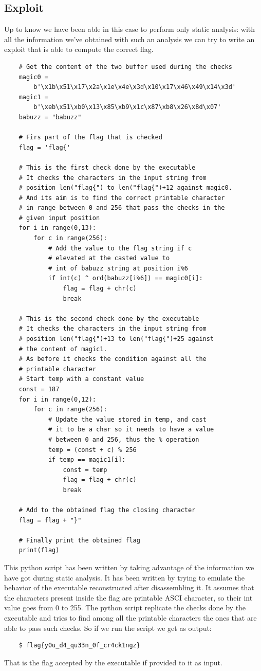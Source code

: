 \documentclass{article}
\begin{document}
\subsection{Exploit}
Up to know we have been able in this case to perform only static analysis: with all the information we've obtained with such an analysis we can try to write an exploit that is able to compute the correct flag.
\begin{verbatim}
    # Get the content of the two buffer used during the checks
    magic0 = 
        b'\x1b\x51\x17\x2a\x1e\x4e\x3d\x10\x17\x46\x49\x14\x3d'
    magic1 = 
        b'\xeb\x51\xb0\x13\x85\xb9\x1c\x87\xb8\x26\x8d\x07'
    babuzz = "babuzz"

    # Firs part of the flag that is checked
    flag = 'flag{'

    # This is the first check done by the executable
    # It checks the characters in the input string from
    # position len("flag{") to len("flag{")+12 against magic0.
    # And its aim is to find the correct printable character
    # in range between 0 and 256 that pass the checks in the 
    # given input position
    for i in range(0,13):
        for c in range(256):
            # Add the value to the flag string if c
            # elevated at the casted value to
            # int of babuzz string at position i%6
            if int(c) ^ ord(babuzz[i%6]) == magic0[i]:
                flag = flag + chr(c)
                break

    # This is the second check done by the executable
    # It checks the characters in the input string from
    # position len("flag{")+13 to len("flag{")+25 against
    # the content of magic1.
    # As before it checks the condition against all the
    # printable character
    # Start temp with a constant value
    const = 187
    for i in range(0,12):
        for c in range(256):
            # Update the value stored in temp, and cast
            # it to be a char so it needs to have a value
            # between 0 and 256, thus the % operation
            temp = (const + c) % 256
            if temp == magic1[i]:
                const = temp
                flag = flag + chr(c)
                break

    # Add to the obtained flag the closing character
    flag = flag + "}"

    # Finally print the obtained flag
    print(flag)
\end{verbatim}
This python script has been written by taking advantage of the information we have got during static analysis. It has been written by trying to emulate the behavior of the executable reconstructed after disassembling it.
It assumes that the characters present inside the flag are printable ASCI character, so their int value goes from 0 to 255. The python script replicate the checks done by the executable and tries to find among all the printable characters 
the ones that are able to pass such checks.
So if we run the script we get as output:
\begin{verbatim}
    $ flag{y0u_d4_qu33n_0f_cr4ck1ngz}
\end{verbatim}
That is the flag accepted by the executable if provided to it as input.
\end{document}
